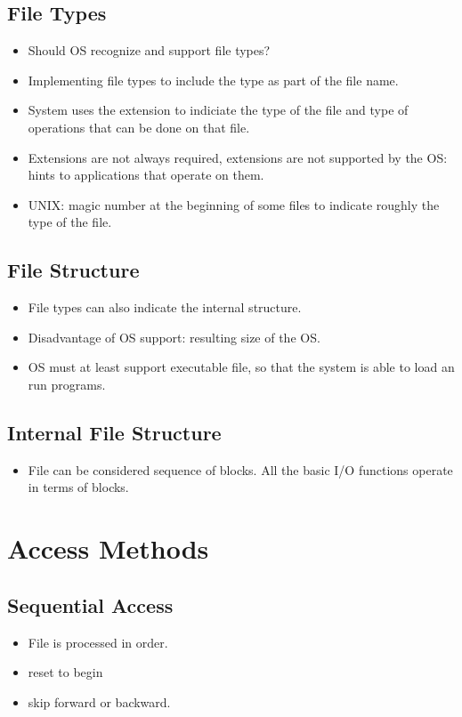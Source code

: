 \documentclass[10pt]{report}
\begin{document}
		\subsection{File Types}
			\begin{itemize}
					\item Should OS recognize and support file types?
					\item Implementing file types to include the type as part of the file name.
					\item System uses the extension to indiciate the type of the file and type of operations that can be done on that file.
					\item Extensions are not always required, extensions are not supported by the OS: hints to applications that operate on them.
					\item UNIX: magic number at the beginning of some files to indicate roughly the type of the file.
			\end{itemize}

		\subsection{File Structure}
			\begin{itemize}
					\item File types can also indicate the internal structure.
					\item Disadvantage of OS support: resulting size of the OS.
					\item OS must at least support executable file, so that the system is able to load an run programs.
			\end{itemize}

		\subsection{Internal File Structure}
			\begin{itemize}
					\item File can be considered sequence of blocks. All the basic I/O functions operate in terms of blocks.
			\end{itemize}

	\section{Access Methods}
		\subsection{Sequential Access}
			\begin{itemize}
					\item File is processed in order.
					\item reset to begin
					\item skip forward or backward.
			\end{itemize}
\end{document}
